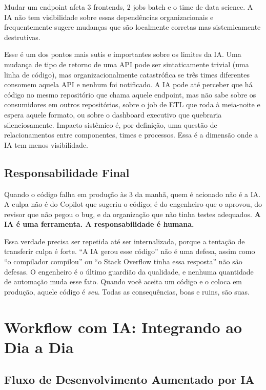 Mudar um endpoint afeta 3 frontends, 2 jobs batch e o time de data
science. A IA não tem visibilidade sobre essas dependências organizacionais
e frequentemente sugere mudanças que são localmente corretas mas
sistemicamente destrutivas.

Esse é um dos pontos mais sutis e importantes sobre os limites da IA. Uma mudança de
tipo de retorno de uma API pode ser sintaticamente trivial (uma linha de código), mas
organizacionalmente catastrófica se três times diferentes consomem aquela API e
nenhum foi notificado. A IA pode até perceber que há código no mesmo repositório que
chama aquele endpoint, mas não sabe sobre os consumidores em outros repositórios, sobre
o job de ETL que roda à meia-noite e espera aquele formato, ou sobre o dashboard
executivo que quebraria silenciosamente. Impacto sistêmico é, por definição, uma
questão de relacionamentos entre componentes, times e processos. Essa é
a dimensão onde a IA tem menos visibilidade.

\subsection{Responsabilidade Final}

Quando o código falha em produção às 3 da manhã, quem é acionado não é a
IA. A culpa não é do Copilot que sugeriu o código; é do engenheiro que
o aprovou, do revisor que não pegou o bug, e da organização que não tinha
testes adequados. \textbf{A IA é uma ferramenta. A responsabilidade é
humana.}

Essa verdade precisa ser repetida até ser internalizada, porque a tentação
de transferir culpa é forte. ``A IA gerou esse código'' não é uma defesa, assim como
``o compilador compilou'' ou ``o Stack Overflow tinha essa resposta'' não são defesas.
O engenheiro é o último guardião da qualidade, e nenhuma quantidade de automação muda
esse fato. Quando você aceita um código e o coloca em produção, aquele
código é \textit{seu}. Todas as consequências, boas e ruins, são suas.

\section{Workflow com IA: Integrando ao Dia a Dia}

\subsection{Fluxo de Desenvolvimento Aumentado por IA}

